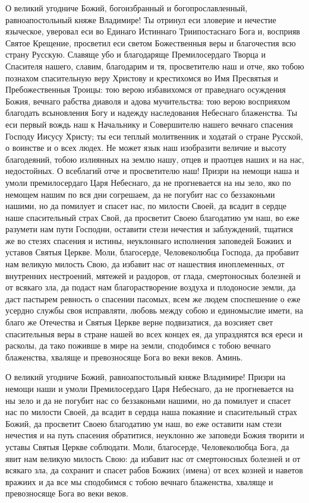 О великий угодниче Божий, богоизбранный и богопрославленный, равноапостольный княже Владимире! Ты отринул еси зловерие и нечестие языческое, уверовал еси во Единаго Истиннаго Триипостаснаго Бога и, восприяв Святое Крещение, просветил еси светом Божественныя веры и благочестия всю страну Русскую. Славяще убо и благодаряще Премилосердаго Творца и Спасителя нашего, славим, благодарим и тя, просветителю наш и отче, яко тобою познахом спасительную веру Христову и крестихомся во Имя Пресвятыя и Пребожественныя Троицы: тою верою избавихомся от праведнаго осуждения Божия, вечнаго рабства диаволя и адова мучительства: тою верою восприяхом благодать всыновления Богу и надежду наследования Небеснаго блаженства. Ты еси первый вождь наш к Начальнику и Совершителю нашего вечнаго спасения Господу Иисусу Христу; ты еси теплый молитвенник и ходатай о стране Русской, о воинстве и о всех людех. Не может язык наш изобразити величие и высоту благодеяний, тобою излиянных на землю нашу, отцев и праотцев наших и на нас, недостойных. О всеблагий отче и просветителю наш! Призри на немощи наша и умоли премилосердаго Царя Небеснаго, да не прогневается на ны зело, яко по немощем нашим по вся дни согрешаем, да не погубит нас со беззаконьми нашими, но да помилует и спасет нас, по милости Своей, да всадит в сердце наше спасительный страх Свой, да просветит Своею благодатию ум наш, во еже разумети нам пути Господни, оставити стези нечестия и заблуждений, тщатися же во стезях спасения и истины, неуклоннаго исполнения заповедей Божиих и уставов Святыя Церкве. Моли, благосерде, Человеколюбца Господа, да пробавит нам великую милость Свою, да избавит нас от нашествия иноплеменных, от внутренних нестроений, мятежей и раздоров, от глада, смертоносных болезней и от всякаго зла, да подаст нам благорастворение воздуха и плодоносие земли, да даст пастырем ревность о спасении пасомых, всем же людем споспешение о еже усердно службы своя исправляти, любовь между собою и единомыслие имети, на благо же Отечества и Святыя Церкве верне подвизатися, да возсияет свет спасительныя веры в стране нашей во всех концех ея, да упразднятся вся ереси и расколы, да тако поживше в мире на земли, сподобимся с тобою вечнаго блаженства, хваляще и превозносяще Бога во веки веков. Аминь.



О великий угодниче Божий, равноапостольный княже Владимире! Призри на немощи наши и умоли Премилосердаго Царя Небеснаго, да не прогневается на ны зело и да не погубит нас со беззаконьми нашими, но да помилует и спасет нас по милости Своей, да всадит в сердца наша покаяние и спасительный страх Божий, да просветит Своею благодатию ум наш, во еже оставити нам стези нечестия и на путь спасения обратитися, неуклонно же заповеди Божия творити и уставы Святыя Церкве соблюдати. Моли, благосерде, Человеколюбца Бога, да явит нам великую милость Свою: да избавит нас от смертоносных болезней и от всякаго зла, да сохранит и спасет рабов Божиих (имена) от всех козней и наветов вражиих и да все мы сподобимся с тобою вечнаго блаженства, хваляще и превозносяще Бога во веки веков.\mychapterending

